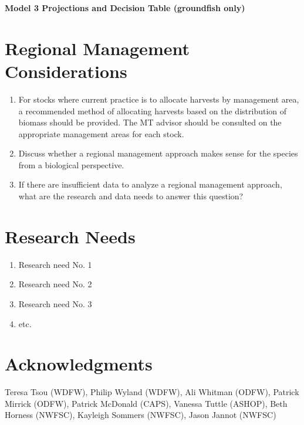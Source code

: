 \documentclass[12pt,]{article}
\providecommand{\tightlist}{%
  \setlength{\itemsep}{0pt}\setlength{\parskip}{0pt}}
\begin{document}
\textbf{Model 3 Projections and Decision Table (groundfish only)}

\section{Regional Management
Considerations}\label{regional-management-considerations}

\begin{enumerate}
\def\labelenumi{\arabic{enumi}.}
\tightlist
\item
  For stocks where current practice is to allocate harvests by
  management area, a recommended method of allocating harvests based on
  the distribution of biomass should be provided. The MT advisor should
  be consulted on the appropriate management areas for each stock.
\item
  Discuss whether a regional management approach makes sense for the
  species from a biological perspective.
\item
  If there are insufficient data to analyze a regional management
  approach, what are the research and data needs to answer this
  question?
\end{enumerate}

\section{Research Needs}\label{research-needs}

\begin{enumerate}

\item Research need No. 1

\item Research need No. 2

\item Research need No. 3

\item etc.

\end{enumerate}

\section{Acknowledgments}\label{acknowledgments}

Teresa Tsou (WDFW), Philip Wyland (WDFW), Ali Whitman (ODFW), Patrick
Mirrick (ODFW), Patrick McDonald (CAPS), Vanessa Tuttle (ASHOP), Beth
Horness (NWFSC), Kayleigh Sommers (NWFSC), Jason Jannot (NWFSC)
\end{document}
